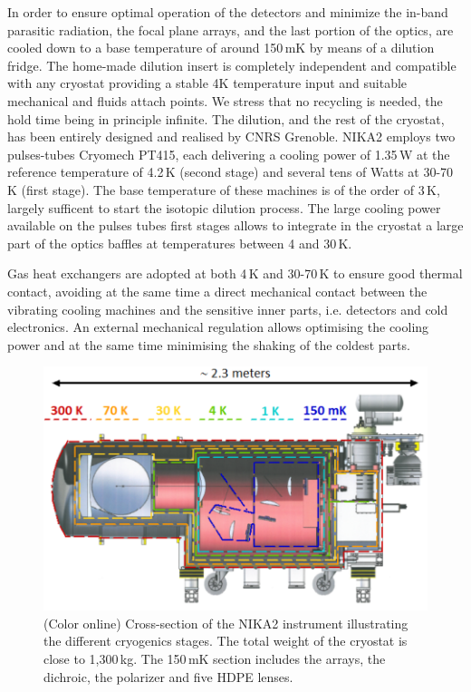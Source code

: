 \documentclass[]{aa} %
\begin{document}
In order to ensure optimal operation of the detectors and minimize the in-band parasitic radiation, the focal plane arrays, and the last portion of the optics, are cooled down to a base temperature of around 150\,mK by means of a dilution fridge. The home-made dilution insert is completely independent and compatible with any cryostat providing a stable 4K temperature input and suitable mechanical and fluids attach points. We stress that no recycling is needed, the hold time being in principle infinite. The dilution, and the rest of the cryostat, has been entirely designed and realised by CNRS Grenoble. NIKA2 employs two pulses-tubes Cryomech PT415, each delivering a cooling power of 1.35\,W at the reference temperature of 4.2\,K (second stage) and several tens of Watts at 30-70\,K (first stage). The base temperature of these machines is of the order of 3\,K, largely sufficent to start the isotopic dilution process. The large cooling power available on the pulses tubes first stages allows to integrate in the cryostat a large part of the optics baffles at temperatures between 4 and 30\,K. 

Gas heat exchangers are adopted at both 4\,K and 30-70\,K to ensure good thermal contact, avoiding at the same time a direct mechanical contact between the vibrating cooling machines and the sensitive inner parts, i.e. detectors and cold electronics. An external mechanical regulation allows optimising the cooling power and at the same time minimising the shaking of the coldest parts. 

\begin{figure}[h]
   \centering
   \includegraphics[width=.95\linewidth]{NIKA2_cryoStages.png}
      \caption{(Color online) Cross-section of the NIKA2 instrument illustrating the different cryogenics stages. The total weight of the cryostat is close to 1,300\,kg. The 150\,mK section includes the arrays, the dichroic, the polarizer and five HDPE lenses.}
         \label{Cryostat_cryo}
\end{figure}
\end{document}
